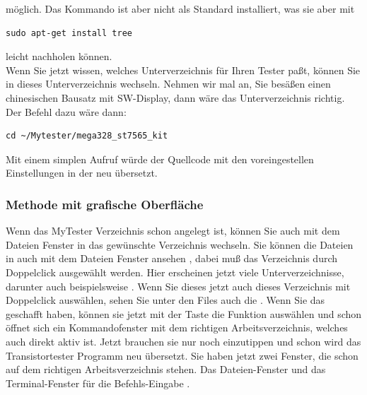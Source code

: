  \vspace{-0.5em} 
möglich. Das Kommando ist aber nicht als Standard installiert, was sie aber mit
\begin{large} \vspace{-0.4em} \begin{verbatim}
sudo apt-get install tree
\end{verbatim} \end{large}
 \vspace{-0.5em} 
leicht nachholen können.\\
Wenn Sie jetzt wissen, welches Unterverzeichnis für Ihren Tester paßt,
können Sie in dieses Unterverzeichnis wechseln.
Nehmen wir mal an, Sie besäßen einen chinesischen Bausatz mit SW-Display, 
dann wäre das Unterverzeichnis  richtig.
Der Befehl dazu wäre dann:
\begin{large} \vspace{-0.4em} \begin{verbatim}
cd ~/Mytester/mega328_st7565_kit
\end{verbatim} \end{large}
\vspace{-0.5em} 
Mit einem simplen  Aufruf würde der Quellcode mit
den voreingestellen Einstellungen in der  neu übersetzt.

\subsubsection{Methode mit grafische Oberfläche}
Wenn das MyTester Verzeichnis schon angelegt ist, können Sie auch mit
dem Dateien Fenster in das gewünschte Verzeichnis wechseln.
Sie können die Dateien in  auch mit dem Dateien Fenster ansehen
, dabei muß das Verzeichnis  durch \LMB Doppelclick ausgewählt werden.
Hier erscheinen jetzt viele Unterverzeichnisse, darunter auch beispielsweise
.
Wenn Sie dieses jetzt auch dieses Verzeichnis mit \LMB Doppelclick auswählen,
sehen Sie unter den Files auch die .
Wenn Sie das geschafft haben, können sie jetzt mit der \RMB Taste die Funktion 
auswählen und schon öffnet sich ein Kommandofenster mit dem richtigen Arbeitsverzeichnis,
welches auch direkt aktiv ist. Jetzt brauchen sie nur noch  einzutippen und schon wird
das Transistortester Programm neu übersetzt.
Sie haben jetzt zwei Fenster, die schon auf dem richtigen Arbeitsverzeichnis stehen.
Das Dateien-Fenster und das Terminal-Fenster für die Befehls-Eingabe .

